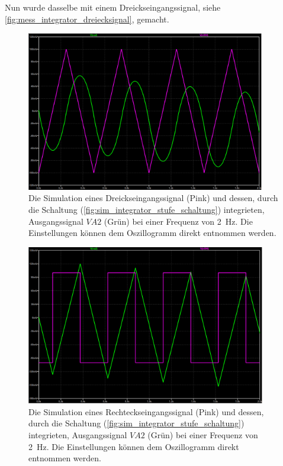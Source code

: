 \documentclass[12pt,english,ngerman]{scrartcl}
\begin{document}
Nun wurde dasselbe mit einem Dreickseingangssignal, siehe
\autoref{fig:mess_integrator_dreiecksignal}, gemacht.

\begin{figure}[H]
  \centering
    \includegraphics[width=\linewidth, height=7cm]{./figures/integrator/sim/mit_stufe/dreieck100mv_500ms.png}
    \caption{Die Simulation eines Dreickseingangssignal (Pink) und dessen,
    durch die Schaltung (\autoref{fig:sim_integrator_stufe_schaltung})
    integrieten, Ausgangssignal $VA2$ (Grün) bei einer Frequenz von
    \SI{2}{\hertz}. Die Einstellungen können dem Oszillogramm direkt entnommen
    werden.}
  \label{fig:sim_int_stufe_tri}
\end{figure}

\begin{figure}[H]
  \centering
    \includegraphics[width=\linewidth, height=7cm]{./figures/integrator/sim/mit_stufe/rechteck100mv_500ms.png}
  \caption{Die Simulation eines Rechteckseingangssignal (Pink) und dessen,
  durch die Schaltung (\autoref{fig:sim_integrator_stufe_schaltung})
  integrieten, Ausgangssignal $VA2$ (Grün) bei einer Frequenz von \SI{2}{\hertz}.
  Die Einstellungen können dem Oszillogramm direkt entnommen werden.}
  \label{fig:sim_int_stufe_rect}
\end{figure}
\end{document}
